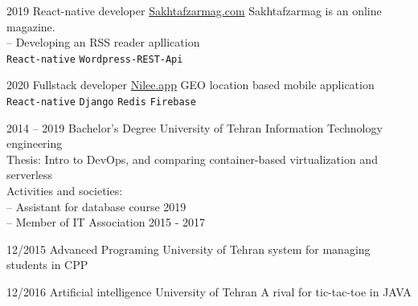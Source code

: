 \documentclass[9pt]{developercv}
\begin{document}
\begin{entrylist}
	\entry
	{2019}
	{React-native developer}
	{{\href{https://www.sakhtafzarmag.com/}{Sakhtafzarmag.com}}}
	{
		Sakhtafzarmag is an online magazine. \\
		-- Developing an RSS reader apllication \\
		\texttt{React-native}\slashsep
		\texttt{Wordpress-REST-Api}\slashsep
	}
\end{entrylist}
\begin{entrylist}
	\entry
	{2020}
	{Fullstack developer}
	{{\href{https://www.nilee.app/}{Nilee.app}}}
	{
		GEO location based mobile application \\
		\texttt{React-native}\slashsep
		\texttt{Django}\slashsep
		\texttt{Redis}\slashsep
		\texttt{Firebase}\\
	}
\end{entrylist}

\begin{entrylist}
	\entry
	{2014 -- 2019}
	{Bachelor's Degree}
	{University of Tehran}
	{
		Information Technology engineering \\
		Thesis: Intro to DevOps, and comparing container-based virtualization and serverless \\
		Activities and societies: \\
		-- Assistant for database course 2019 \\
		-- Member of IT Association 2015 - 2017 \\
	}
\end{entrylist}




\begin{entrylist}
	\entry
	{12/2015}
	{Advanced Programing}
	{University of Tehran}
	{system for managing students in CPP}
\end{entrylist}
\begin{entrylist}
	\entry
	{12/2016}
	{Artificial intelligence}
	{University of Tehran}
	{A rival for tic-tac-toe in JAVA}
\end{entrylist}


\newpage
\end{document}
